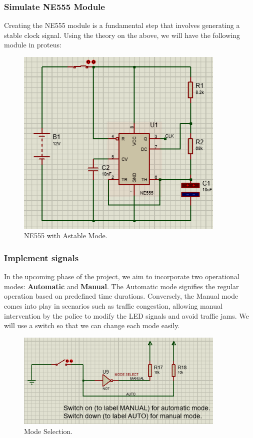 \documentclass{article}
\begin{document}
\subsubsection{Simulate NE555 Module}
Creating the NE555 module is a fundamental step that involves generating a stable clock signal. Using the theory on the above, we will have the following module in proteus:\par
\begin{figure}[h]
    \centering
    \includegraphics[width=10cm]{Pic/Proteus/NE555_Module_Proteus.png}
    \caption{NE555 with Astable Mode.}
    \label{fig:enter-label}
\end{figure}

\subsubsection{Implement signals}
In the upcoming phase of the project, we aim to incorporate two operational modes: \textbf{Automatic} and \textbf{Manual}. The Automatic mode signifies the regular operation based on predefined time durations. Conversely, the Manual mode comes into play in scenarios such as traffic congestion, allowing manual intervention by the police to modify the LED signals and avoid traffic jams. We will use a switch so that we can change each mode easily.\par

\begin{figure}[h]
    \centering
    \includegraphics[width=10cm]{Pic/Proteus/Mode Selection.png}
    \caption{Mode Selection.}
    \label{fig:enter-label}
\end{figure}
\newpage
\end{document}

